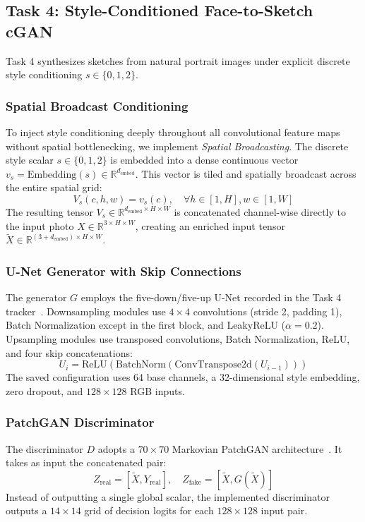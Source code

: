 \documentclass[journal,compsoc]{IEEEtran}
\begin{document}
\subsection{Task 4: Style-Conditioned Face-to-Sketch cGAN}
Task 4 synthesizes sketches from natural portrait images under explicit discrete style conditioning $s \in \{0, 1, 2\}$.

\subsubsection{Spatial Broadcast Conditioning}
To inject style conditioning deeply throughout all convolutional feature maps without spatial bottlenecking, we implement \textit{Spatial Broadcasting}. The discrete style scalar $s \in \{0, 1, 2\}$ is embedded into a dense continuous vector $v_s = \text{Embedding}(s) \in \mathbb{R}^{d_{\text{embed}}}$. This vector is tiled and spatially broadcast across the entire spatial grid:
\begin{equation}
    V_s(c, h, w) = v_s(c), \quad \forall h \in [1, H], w \in [1, W]
\end{equation}
The resulting tensor $V_s \in \mathbb{R}^{d_{\text{embed}} \times H \times W}$ is concatenated channel-wise directly to the input photo $X \in \mathbb{R}^{3 \times H \times W}$, creating an enriched input tensor $\tilde{X} \in \mathbb{R}^{(3 + d_{\text{embed}}) \times H \times W}$.

\subsubsection{U-Net Generator with Skip Connections}
The generator $G$ employs the five-down/five-up U-Net recorded in the Task 4 tracker~\cite{ronneberger2015u}. Downsampling modules use $4 \times 4$ convolutions (stride 2, padding 1), Batch Normalization except in the first block, and LeakyReLU ($\alpha = 0.2$). Upsampling modules use transposed convolutions, Batch Normalization, ReLU, and four skip concatenations:
\begin{equation}
    U_i = \text{ReLU}(\text{BatchNorm}(\text{ConvTranspose2d}(U_{i-1})))
\end{equation}
The saved configuration uses 64 base channels, a 32-dimensional style embedding, zero dropout, and $128\times128$ RGB inputs.

\subsubsection{PatchGAN Discriminator}
The discriminator $D$ adopts a $70 \times 70$ Markovian PatchGAN architecture~\cite{isola2017image, li2016precomputed}. It takes as input the concatenated pair:
\begin{equation}
    Z_{\text{real}} = [\tilde{X}, Y_{\text{real}}], \quad Z_{\text{fake}} = [\tilde{X}, G(\tilde{X})]
\end{equation}
Instead of outputting a single global scalar, the implemented discriminator outputs a $14 \times 14$ grid of decision logits for each $128\times128$ input pair.
\end{document}
